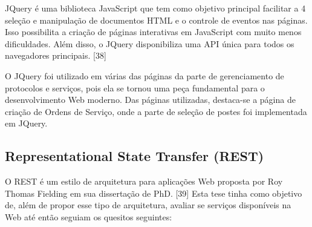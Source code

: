\documentclass[
	article,			%
	11pt,				%
	oneside,			%
	a4paper,			%
	english,			%
	brazil,				%
	sumario=tradicional
	]{abntex2}
\begin{document}
JQuery é uma biblioteca JavaScript que tem como objetivo principal facilitar a 4
seleção e manipulação de documentos HTML e o controle de eventos nas páginas.
Isso possibilita a criação de páginas interativas em JavaScript com muito menos
dificuldades. Além disso, o JQuery disponibiliza uma API única para todos os
navegadores principais. [38]

O JQuery foi utilizado em várias das páginas da parte de gerenciamento de
protocolos e serviços, pois ela se tornou uma peça fundamental para o
desenvolvimento Web moderno. Das páginas utilizadas, destaca-se a página de
criação de Ordens de Serviço, onde a parte de seleção de postes foi
implementada em JQuery.


\subsection{Representational State Transfer (REST)}

O REST é um estilo de arquitetura para aplicações Web proposta por Roy Thomas
Fielding em sua dissertação de PhD. [39] Esta tese tinha como objetivo de,
além de propor esse tipo de arquitetura, avaliar se serviços disponíveis na Web
até então seguiam os quesitos seguintes:
\end{document}
